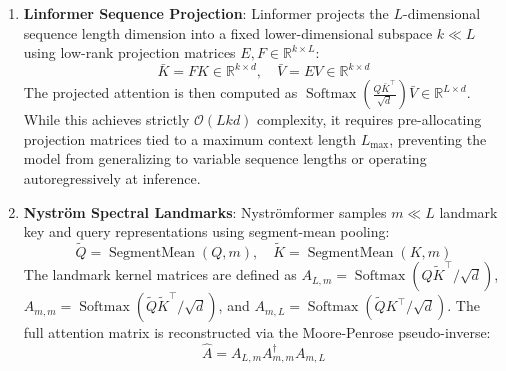 \documentclass{article}
\begin{document}
\begin{enumerate}
\begin{equation}
        S_{i, j} = \left(\operatorname{ReLU}(q_i) \cos\left(\frac{\pi i}{2 M}\right)\right) \left(\operatorname{ReLU}(k_j) \cos\left(\frac{\pi j}{2 M}\right)\right)^\top + \left(\operatorname{ReLU}(q_i) \sin\left(\frac{\pi i}{2 M}\right)\right) \left(\operatorname{ReLU}(k_j) \sin\left(\frac{\pi j}{2 M}\right)\right)^\top
    \end{equation}
    This enables exact right-to-left linear accumulation via two parallel running state accumulators. However, as demonstrated in our empirical long-context scaling benchmarks (Table~\ref{tab:long_context}), dynamically computing trigonometric coordinates inside the inner sequence loop incurs heavy register pressure and instruction stalls on GPU hardware, degrading physical execution throughput at $T=8,192$.
    \item \textbf{Linformer Sequence Projection}:
    Linformer \citep{wang2020linformer} projects the $L$-dimensional sequence length dimension into a fixed lower-dimensional subspace $k \ll L$ using low-rank projection matrices $E, F \in \mathbb{R}^{k \times L}$:
    \begin{equation}
        \bar{K} = F K \in \mathbb{R}^{k \times d}, \quad \bar{V} = E V \in \mathbb{R}^{k \times d}
    \end{equation}
    The projected attention is then computed as $\operatorname{Softmax}\left(\frac{Q \bar{K}^\top}{\sqrt{d}}\right) \bar{V} \in \mathbb{R}^{L \times d}$. While this achieves strictly $\mathcal{O}(L k d)$ complexity, it requires pre-allocating projection matrices tied to a maximum context length $L_{\max}$, preventing the model from generalizing to variable sequence lengths or operating autoregressively at inference.
    \item \textbf{Nystr{\"o}m Spectral Landmarks}:
    Nystr{\"o}mformer \citep{xiong2021nystromformer} samples $m \ll L$ landmark key and query representations using segment-mean pooling:
    \begin{equation}
        \tilde{Q} = \operatorname{SegmentMean}(Q, m), \quad \tilde{K} = \operatorname{SegmentMean}(K, m)
    \end{equation}
    The landmark kernel matrices are defined as $A_{L, m} = \operatorname{Softmax}(Q \tilde{K}^\top / \sqrt{d})$, $A_{m, m} = \operatorname{Softmax}(\tilde{Q} \tilde{K}^\top / \sqrt{d})$, and $A_{m, L} = \operatorname{Softmax}(\tilde{Q} K^\top / \sqrt{d})$. The full attention matrix is reconstructed via the Moore-Penrose pseudo-inverse:
    \begin{equation}
        \hat{A} = A_{L, m} A_{m, m}^\dagger A_{m, L}

\end{equation}
\end{enumerate}
\end{document}

